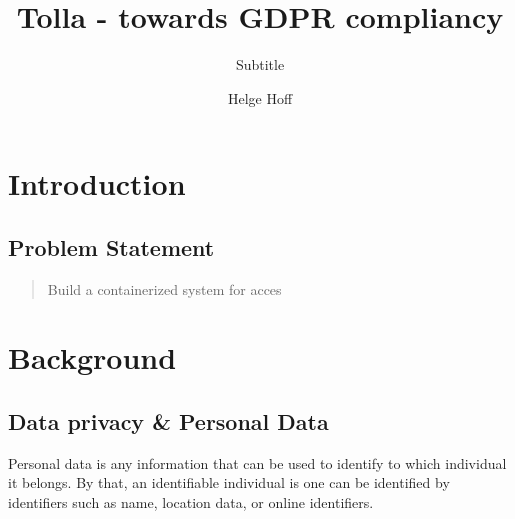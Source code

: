 \documentclass[USenglish]{uit-thesis}
\begin{document}

\title{Tolla - towards GDPR compliancy}
\subtitle{Subtitle}			%
\author{Helge Hoff}

\maketitle

\frontmatter

\begin{epigraph}
\end{epigraph}

\begin{abstract}
\end{abstract}

\begin{acknowledgement}
\end{acknowledgement}

\tableofcontents

\printacronyms

\listofdefinition

\mainmatter

\chapter{Introduction}

\section{Problem Statement}


\begin{quote}
    Build a containerized system for acces
\end{quote}

\chapter{Background}
\section{Data privacy \& Personal Data}
Personal data is any information that can be used to identify to which individual it belongs.
By that, an identifiable individual is one can be identified by identifiers such as name,
location data, or online identifiers.
\end{document}
